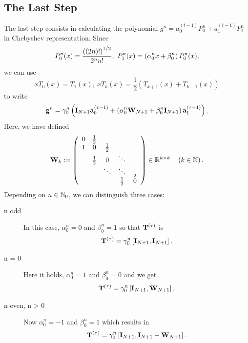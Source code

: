 \subsection{The Last Step}
\label{NFSFT:LinearAlgebra:LastStep}
The last step consists in calculating the polynomial $g^{n} = a_{0}^{(t-1)} P_{0}^{n} + a_{1}^{(t-1)} P_{1}^{n}$ in Chebyshev representation. Since 
\[
  P_{0}^n{\hspace{-0.4ex}}\left(x\right) = \frac{\left( \left( 2n \right) ! \right)^{1/2}}{2^n n!},\ P_{1}^n{\hspace{-0.4ex}}\left(x\right) = \left(\alpha_{0}^n x + \beta_{0}^n\right)P_{0}^n(x),
\] 
we can use 
\[
  xT_{0}(x) = T_{1}(x),\ xT_{k}(x) = \frac{1}{2}\left( T_{k+1}(x) + T_{k-1}(x) \right)
\] 
to write
\[ 
  \mathbf{g}^{n} = \gamma_{0}^n \left( \mathbf{I}_{N+1} \mathbf{a}_{0}^{(\tau-1)} + \left( \alpha_{0}^n\mathbf{W}_{N+1} + \beta_{0}^n\mathbf{I}_{N+1} \right) \mathbf{a}_{1}^{(\tau-1)} \right).
\]
Here, we have defined
\[
\mathbf{W}_{k} :=
\left(
\begin{array}{ccccccc}
  0 & \frac{1}{2} &             &                           \\
  1 &           0 & \frac{1}{2} &                           \\
    & \frac{1}{2} &           0 & \ddots                    \\
    &             &      \ddots & \ddots      & \frac{1}{2} \\
    &             &             & \frac{1}{2} &           0
\end{array}
\right)
\in \mathbb{R}^{k \times k} \quad \left(k \in \mathbb{N}\right).
\]
Depending on $n \in \mathbb{N}_{0}$, we can distinguish three cases:
\begin{description}
  \item[n odd] In this case, $\alpha_{0}^n = 0$ and $\beta_{0}^n = 1$ so that $\mathbf{T}^{(\tau)}$ is 
    \[
      \mathbf{T}^{(\tau)} = \gamma_{0}^n \left[ \mathbf{I}_{N+1}, \mathbf{I}_{N+1} \right].
    \]
  \item[n = 0] Here it holds, $\alpha_{0}^n = 1$ and $\beta_{0}^n = 0$ and we get \[\mathbf{T}^{(\tau)} = \gamma_{0}^n \left[ \mathbf{I}_{N+1}, \mathbf{W}_{N+1} \right].\]
  \item[n even, n > 0] Now $\alpha_{0}^n = -1$ and $\beta_{0}^n = 1$ which results in \[\mathbf{T}^{(\tau)} = \gamma_{0}^n \left[ \mathbf{I}_{N+1}, \mathbf{I}_{N+1} - \mathbf{W}_{N+1} \right].\]
\end{description}


